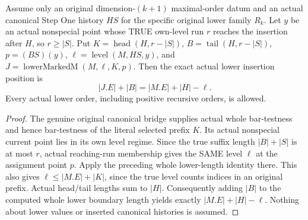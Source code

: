 \begin{theorem}
\label{hir:original-crossing-lower-index-exact}
\leanok
Assume only an original dimension-$(k+1)$ maximal-order datum and an actual
canonical Step One history $HS$ for the specific original lower family
$R_k$. Let $y$ be an actual nonspecial point whose TRUE own-level run
$r$ reaches the insertion after $H$, so $r\geq|S|$. Put
$K=\operatorname{head}(H,r-|S|)$, $B=\operatorname{tail}(H,r-|S|)$, $p=(BS)(y)$,
$\ell=\operatorname{level}(M,HS,y)$, and
$J=\operatorname{lowerMarkedM}(M,\ell,K,p)$.
Then the exact actual lower insertion position is
\[
 |J.E|+|B|=|M.E|+|H|-\ell.
\]
Every actual lower order, including positive recursive orders, is allowed.
\end{theorem}
\begin{proof}
The genuine original canonical bridge supplies actual whole bar-testness and
hence bar-testness of the literal selected prefix $K$. Its actual nonspecial
current point lies in its own level regime. Since the true suffix length
$|B|+|S|$ is at most $r$, actual reaching-run membership gives the SAME level
$\ell$ at the assignment point $p$. Apply the preceding whole lower-length
identity there. This also gives $\ell\leq|M.E|+|K|$, since the true level counts
indices in an original prefix. Actual head/tail lengths sum to $|H|$.
Consequently adding $|B|$ to the computed whole lower boundary length yields
exactly $|M.E|+|H|-\ell$. Nothing about lower values or inserted canonical
histories is assumed.
\end{proof}

